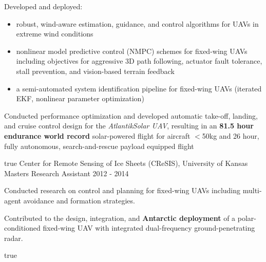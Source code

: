 \begin{cventries}
{\begin{cvitems}
      	\item Developed and deployed:
		\begin{itemize}
			\item robust, wind-aware estimation, guidance, and control algorithms for UAVs in extreme wind conditions
      		\item nonlinear model predictive control (NMPC) schemes for fixed-wing UAVs including objectives for aggressive 3D path following, actuator fault tolerance, stall prevention, and vision-based terrain feedback
      		\item a semi-automated system identification pipeline for fixed-wing UAVs (iterated EKF, nonlinear parameter optimization)
		\end{itemize}		      	
      	\item Conducted performance optimization and developed automatic take-off, landing, and cruise control design for the \emph{AtlantikSolar UAV}, resulting in an \textbf{81.5 hour endurance world record} solar-powered flight for aircraft $<$50kg  and 26 hour, fully autonomous, search-and-rescue payload equipped flight 
      \end{cvitems}
    } %
    {} %
    {true}
    {}
%   
\cvexpentry
  	{Center for Remote Sensing of Ice Sheets (CReSIS), University of Kansas} %
  	{Masters Research Assistant} %
    {} %
    {2012 - 2014} %
    {
      \begin{cvitems} %
      	\item Conducted research on control and planning for fixed-wing UAVs including multi-agent avoidance and formation strategies.
      	\item Contributed to the design, integration, and \textbf{Antarctic deployment} of a polar-conditioned fixed-wing UAV with integrated dual-frequency ground-penetrating radar.
      \end{cvitems}
    } %
    {} %
    {true}
    {}
\end{cventries}
